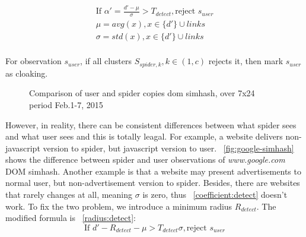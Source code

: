 \begin{equation}
  \label{coefficient:detect}
  \begin{gathered}
    \text {If } \alpha' = \frac{d' - \mu}{\sigma} > T_{detect}, \text{reject } s_{user} \\
    \mu = avg(x), x \in  \{d'\} \cup links \\
    \sigma = std(x), x \in \{d'\} \cup links \\
  \end{gathered}
\end{equation}

For observation $s_{user}$, if all clusters $S_{spider, k}, k \in (1, c)$ rejects it, then
mark $s_{user}$ as cloaking.

\begin{figure}[t]
  \centering
  \caption{Comparison of user and spider copies dom simhash, over 7x24 period Feb.1-7, 2015}
  \label{fig:google-simhash}
\end{figure}

However, in reality, there can be consistent differences between what spider
sees and what user sees and this is totally leagal. For example, a website
delivers non-javascript version to spider, but javascript version to user.
~\autoref{fig:google-simhash} shows the difference between spider and user
observations of {\it www.google.com} DOM simhash. Another example is that a website may
present advertisements to normal user, but non-advertisement version to spider.
Besides, there are websites that rarely changes at all, meaning $\sigma$ is
zero, thus ~\autoref{coefficient:detect} doesn't work. To fix the two problem, we introduce
a minimum radius $R_{detect}$. The modified formula is ~\autoref{radius:detect}:
\begin{equation}
  \label{radius:detect}
  \text{If } d' - R_{detect} - \mu > T_{detect} \sigma, \text{reject } s_{user}
\end{equation}

